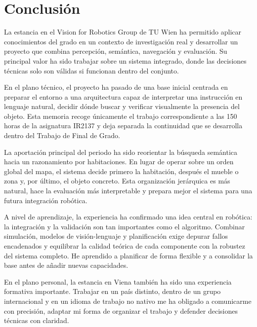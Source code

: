 \documentclass[11pt,fleqn,openany]{book} %
\begin{document}

\chapter{Conclusión}\label{chap:conclusion}

La estancia en el Vision for Robotics Group de TU Wien ha permitido aplicar conocimientos del grado en un contexto de investigación real y desarrollar un proyecto que combina percepción, semántica, navegación y evaluación. Su principal valor ha sido trabajar sobre un sistema integrado, donde las decisiones técnicas solo son válidas si funcionan dentro del conjunto.

En el plano técnico, el proyecto ha pasado de una base inicial centrada en preparar el entorno a una arquitectura capaz de interpretar una instrucción en lenguaje natural, decidir dónde buscar y verificar visualmente la presencia del objeto. Esta memoria recoge únicamente el trabajo correspondiente a las 150 horas de la asignatura IR2137 y deja separada la continuidad que se desarrolla dentro del Trabajo de Final de Grado.

La aportación principal del periodo ha sido reorientar la búsqueda semántica hacia un razonamiento por habitaciones. En lugar de operar sobre un orden global del mapa, el sistema decide primero la habitación, después el mueble o zona y, por último, el objeto concreto. Esta organización jerárquica es más natural, hace la evaluación más interpretable y prepara mejor el sistema para una futura integración robótica.

A nivel de aprendizaje, la experiencia ha confirmado una idea central en robótica: la integración y la validación son tan importantes como el algoritmo. Combinar simulación, modelos de visión-lenguaje y planificación exige depurar fallos encadenados y equilibrar la calidad teórica de cada componente con la robustez del sistema completo. He aprendido a planificar de forma flexible y a consolidar la base antes de añadir nuevas capacidades.

En el plano personal, la estancia en Viena también ha sido una experiencia formativa importante. Trabajar en un país distinto, dentro de un grupo internacional y en un idioma de trabajo no nativo me ha obligado a comunicarme con precisión, adaptar mi forma de organizar el trabajo y defender decisiones técnicas con claridad.
\end{document}

